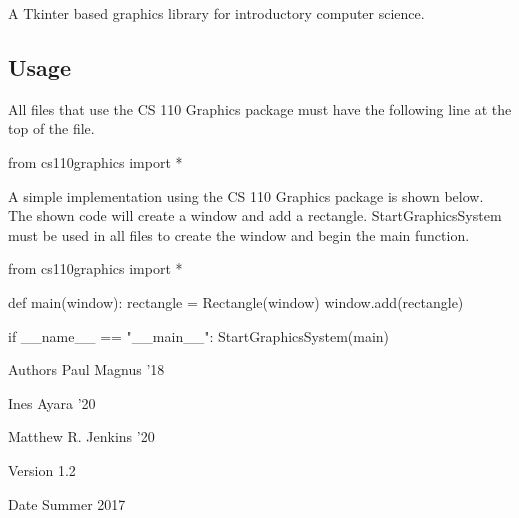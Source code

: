 A Tkinter based graphics library for introductory computer science. \subsection*{Usage}



 All files that use the CS 110 Graphics package must have the following line at the top of the file. 
\begin{DoxyCode}
 from cs110graphics import *
\end{DoxyCode}
 A simple implementation using the CS 110 Graphics package is shown below. The shown code will create a window and add a rectangle. StartGraphicsSystem must be used in all files to create the window and begin the main function. 
\begin{DoxyCode}
 from cs110graphics import *

 def main(window):
     rectangle = Rectangle(window)
     window.add(rectangle)

 if __name__ == "__main__":
     StartGraphicsSystem(main)
\end{DoxyCode}
 \begin{DoxyAuthor}{Authors}
Paul Magnus '18 

Ines Ayara '20 

Matthew R. Jenkins '20 
\end{DoxyAuthor}
\begin{DoxyVersion}{Version}
1.2 
\end{DoxyVersion}
\begin{DoxyDate}{Date}
Summer 2017 
\end{DoxyDate}
